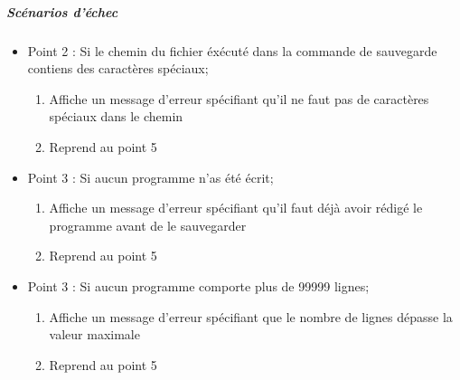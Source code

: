         \subparagraph{Scénarios d'échec}
        \begin{itemize}
        	\item Point 2 : Si le chemin du fichier éxécuté dans la commande de sauvegarde contiens des caractères spéciaux;
        	\begin{enumerate}
        		\item Affiche un message d'erreur spécifiant qu'il ne faut pas de caractères spéciaux dans le chemin
        		\item Reprend au point 5
        	\end{enumerate}

        	\item Point 3 : Si aucun programme n'as été écrit;
        	\begin{enumerate}
        		\item Affiche un message d'erreur spécifiant qu'il faut déjà avoir rédigé le programme avant de le sauvegarder
        		\item Reprend au point 5
        	\end{enumerate}

           \item Point 3 : Si aucun programme comporte plus de 99999 lignes;
        	\begin{enumerate}
        		\item Affiche un message d'erreur spécifiant que le nombre de lignes dépasse la valeur maximale
        		\item Reprend au point 5
        	\end{enumerate}
    	\end{itemize}
